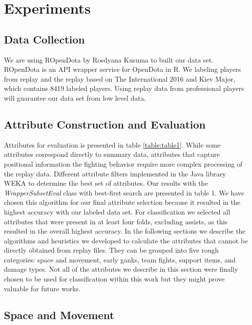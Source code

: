 \section{Experiments}
\label{sec:exp}

\subsection{Data Collection}
\label{sec:datacollection}

We are using ROpenDota by Rosdyana Kusuma to built our data set. ROpenDota is an API wrapper service for OpenDota in R. We labeling players from replay and the replay based on The International 2016 and Kiev Major, which contains 8419 labeled players. Using replay data from professional players will guarantee our data set from low level data.

\subsection{Attribute Construction and Evaluation}
\label{sec:attconsandeval}
Attributes for evaluation is presented in table \ref{table:table1}. While some attributes correspond directly to summary data, attributes that capture positional information the fighting behavior require more complex processing of the replay data. Different attribute filters implemented in the Java library WEKA \cite{hall2009weka} to determine the best set of attributes. Our results with the \textit{WrapperSubsetEval} class with best-first search are presented in table 1. We have chosen this algorithm for our final attribute selection because it resulted in the highest accuracy with our labeled data set. For classification we selected all attributes that were present in at least four folds, excluding assists, as this resulted in the overall highest accuracy. In the following sections we describe the algorithms and heuristics we developed to calculate the attributes that cannot be directly obtained from replay files. They can be grouped into five rough categories: space and movement, early ganks, team fights, support items, and damage types. Not all of the attributes we describe in this section were finally chosen to be used for classification within this work but they might prove valuable for future works.

\subsection{Space and Movement}
\label{spaceandmovement}

